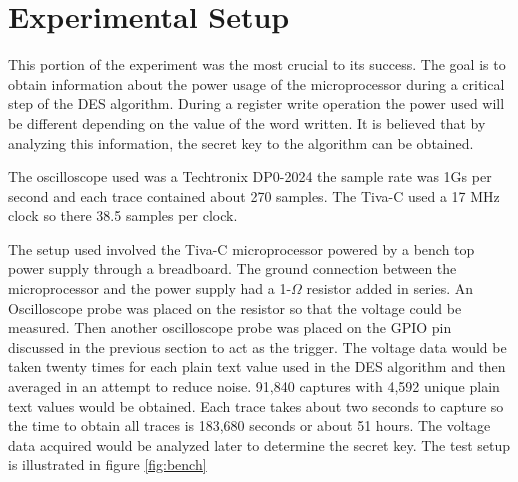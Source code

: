 	

\section{Experimental Setup} \label{sec::expr}
	This portion of the experiment was the most crucial to its success.  The goal is to obtain information about the power usage of the microprocessor during a critical step of the DES algorithm.  During a register write operation the power used will be different depending on the value of the word written.  It is believed that by analyzing this information, the secret key to the algorithm can be obtained.
	
	The oscilloscope used was a Techtronix DP0-2024 the sample rate was 1Gs per second and each trace contained about 270 samples.  The Tiva-C used a 17 MHz clock so there 38.5 samples per clock.
	
	The setup used involved the Tiva-C microprocessor powered by a bench top power supply through a breadboard.  The ground connection between the microprocessor and the power supply had a 1-$\Omega$ resistor added in series.  An Oscilloscope probe was placed on the resistor so that the voltage could be measured.  Then another oscilloscope probe was placed on the GPIO pin discussed in the previous section to act as the trigger.  The voltage data would be taken twenty times for each plain text value used in the DES algorithm and then averaged in an attempt to reduce noise.  91,840 captures with 4,592 unique plain text values would be obtained.  Each trace takes about two seconds to capture so the time to obtain all traces is 183,680 seconds or about 51 hours.  The voltage data acquired would be analyzed later to determine the secret key.  The test setup is illustrated in figure \ref{fig:bench}

